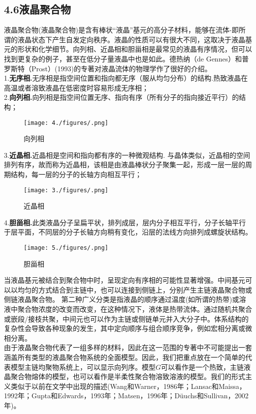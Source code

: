 \subsection{4.6液晶聚合物}

液晶聚合物(液晶聚合物)是含有棒状“液晶”基元的高分子材料，能够在流体-即所谓的液晶状态下产生自发定向秩序。液晶的性质可以有很大不同，这取决于液晶基元的形状和化学细节。向列相、近晶相和胆甾相是最常见的液晶有序情况，但可以找到更复杂的例子，甚至在低分子量液晶中也是如此。德热纳（de Gennes）和普罗斯特（Prost）(1993)的专著对液晶流体的物理学作了很好的介绍。\\

1.\textbf{无序相.}无序相是指空间位置和指向都无序（服从均匀分布）的结构.热致液晶在高温或者溶致液晶在低密度时容易形成无序相；\\

2.\textbf{向列相.}向列相是指空间位置无序、指向有序（所有分子的指向接近平行）的结构；\\
\begin{figure}[H]
	\centering   
	\texttt{[image: 4./figures/.png]}
	\caption{向列相}
\end{figure}
3.\textbf{近晶相.}近晶相是空间和指向都有序的一种微观结构. 与晶体类似，近晶相的空间排列有序，故而称为近晶相，该相是由液晶棒状分子聚集一起，形成一层一层的周期结构，每一层的分子的长轴方向相互平行；\\
\begin{figure}[H]
	\centering   
	\texttt{[image: 3./figures/.png]}
	\caption{近晶相}
\end{figure}
4.\textbf{胆甾相.}此类液晶分子呈扁平状，排列成层，层内分子相互平行，分子长轴平行于层平面，不同层的分子长轴方向稍有变化，沿层的法线方向排列成螺旋状结构。\\
\begin{figure}[H]
	\centering   
	\texttt{[image: 5./figures/.png]}
	\caption{胆甾相}
\end{figure}

当液晶基元被结合到聚合物中时，呈现定向有序相的可能性显著增强。中间基元可以以均匀的方式结合到主链中，也可以连接到侧链上，分别产生主链液晶聚合物或侧链液晶聚合物。 第二种广义分类是指液晶的顺序通过温度(如所谓的热带)或溶液中聚合物浓度的改变而改变，在这种情况下，液体是热带流体。通过随机共聚合或嵌段/接枝共聚，中间元也可以作为主链或侧链单元并入大分子中。体系结构的复杂性会导致各种现象的发生，其中定向顺序与组合顺序竞争，例如宏相分离或微相分离。\\

由于液晶聚合物代表了一组多样的材料，因此在这一范围的专著中不可能提出一套涵盖所有类型的液晶聚合物系统的全面模型。因此，我们把重点放在一个简单的代表模型主链均聚物系统上，可以显示向列序。模型$G$可以看作是一个热致，主链液晶聚合物熔体的模型，也可以看作是半柔性聚合物溶致溶液的模型。我们的形式主义类似于以前在文学中出现的描述(Wang和Warner，1986年；Lansac和Maissa，1992年；Gupta和Edwards，1993年；Matsen，1996年；Düuchs和Sullivan，2002年)。\\


